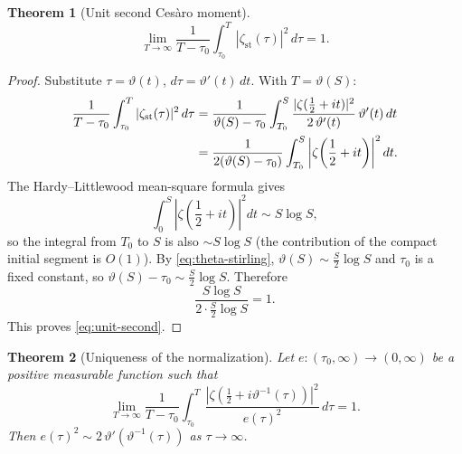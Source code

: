 \documentclass[11pt]{article}
\numberwithin{equation}{section}
\theoremstyle{plain}
\newtheorem{theorem}{Theorem}[section]
\theoremstyle{definition}
\begin{document}
\begin{theorem}[Unit second Ces\`aro moment]
\label{thm:second-moment}
\begin{equation}
\lim_{T\to\infty}
\frac{1}{T-\tau_0}
\int_{\tau_0}^T
|\zeta_{\mathrm{st}}(\tau)|^2\,d\tau
=
1.
\label{eq:unit-second}
\end{equation}
\end{theorem}

\begin{proof}
Substitute \(\tau=\vartheta(t)\), \(d\tau=\vartheta'(t)\,dt\). With \(T=\vartheta(S)\):
\begin{align}
\frac{1}{T-\tau_0}
\int_{\tau_0}^T |\zeta_{\mathrm{st}}(\tau)|^2\,d\tau
&=
\frac{1}{\vartheta(S)-\tau_0}
\int_{T_0}^S
\frac{|\zeta(\frac12+it)|^2}{2\,\vartheta'(t)}
\,\vartheta'(t)\,dt
\notag\\
&=
\frac{1}{2(\vartheta(S)-\tau_0)}
\int_{T_0}^S
\left|\zeta\!\left(\frac12+it\right)\right|^2dt.
\label{eq:mean-square-sub}
\end{align}
The Hardy--Littlewood mean-square formula gives
\begin{equation}
\int_0^S
\left|\zeta\!\left(\frac12+it\right)\right|^2dt
\sim S\log S,
\label{eq:HL}
\end{equation}
so the integral from \(T_0\) to \(S\) is also \(\sim S\log S\) (the contribution of
the compact initial segment is \(O(1)\)). By \eqref{eq:theta-stirling},
\(\vartheta(S)\sim \frac{S}{2}\log S\) and \(\tau_0\) is a fixed constant, so
\(\vartheta(S)-\tau_0\sim\frac{S}{2}\log S\). Therefore
\[
\frac{S\log S}{2\cdot\frac{S}{2}\log S}=1.
\]
This proves \eqref{eq:unit-second}.
\end{proof}

\begin{theorem}[Uniqueness of the normalization]
Let \(e:(\tau_0,\infty)\to(0,\infty)\) be a positive measurable function such that
\[
\lim_{T\to\infty}
\frac{1}{T-\tau_0}
\int_{\tau_0}^T
\frac{|\zeta(\frac12+i\vartheta^{-1}(\tau))|^2}{e(\tau)^2}\,d\tau
=
1.
\]
Then \(e(\tau)^2\sim 2\,\vartheta'(\vartheta^{-1}(\tau))\) as \(\tau\to\infty\).
\end{theorem}
\end{document}
